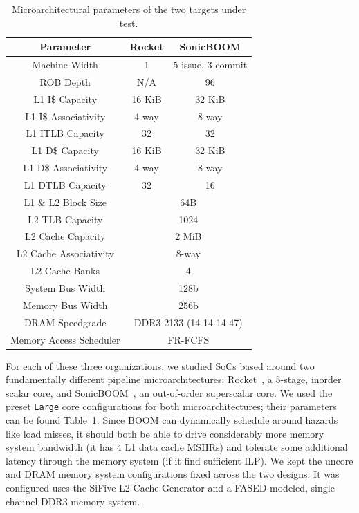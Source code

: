 \begin{table}[t]
\centering
    \begin{tabular}{c c c}
    \hline
        \textbf{Parameter} & \textbf{Rocket} & \textbf{SonicBOOM} \\
    \hline
        Machine Width & 1 & 5 issue, 3 commit\\
        ROB Depth & N/A & 96 \\
        L1 I\$ Capacity & 16 KiB & 32 KiB \\
        L1 I\$ Associativity & 4-way & 8-way \\
        L1 ITLB Capacity & 32 & 32 \\
        L1 D\$ Capacity & 16 KiB & 32 KiB \\
        L1 D\$ Associativity & 4-way & 8-way \\
        L1 DTLB Capacity & 32 & 16 \\
        L1 \& L2 Block Size & \multicolumn{2}{c}{64B} \\
        L2 TLB Capacity &  \multicolumn{2}{c}{1024} \\
        L2 Cache Capacity & \multicolumn{2}{c}{2 MiB}\\
        L2 Cache Associativity & \multicolumn{2}{c}{8-way}\\
        L2 Cache Banks & \multicolumn{2}{c}{4}\\
        System Bus Width & \multicolumn{2}{c}{128b}\\
        Memory Bus Width & \multicolumn{2}{c}{256b}\\
        DRAM Speedgrade & \multicolumn{2}{c}{DDR3-2133 (14-14-14-47)} \\
        Memory Access Scheduler & \multicolumn{2}{c}{FR-FCFS} \\
    \end{tabular}
    \caption{Microarchitectural parameters of the two targets under test.}
    \label{tbl:core-parameters}
\end{table}


For each of these three organizations, we studied SoCs based around two
fundamentally different pipeline microarchitectures: Rocket~\cite{rocketchip},
a 5-stage, inorder scalar core, and SonicBOOM~\cite{SonicBOOM}, an out-of-order
superscalar core. We used the preset \texttt{Large} core configurations for
both microarchitectures; their parameters can be found
Table~\ref{tbl:core-parameters}. Since BOOM can dynamically schedule around
hazards like load misses, it should both be able to drive considerably more
memory system bandwidth (it has 4 L1 data cache MSHRs) and tolerate some
additional latency through the memory system (if it find sufficient ILP). We
kept the uncore and DRAM memory system configurations fixed across the two
designs. It was configured uses the SiFive L2 Cache Generator and a FASED-modeled,
single-channel DDR3 memory system.

